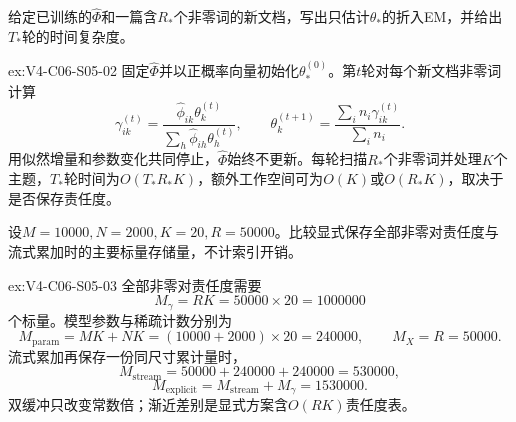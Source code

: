 \begin{SLChapterExercisePairSection}
\begin{exercise}\label{ex:V4-C06-S05-02}
给定已训练的$\widehat\Phi$和一篇含$R_*$个非零词的新文档，写出只估计$\theta_*$的折入EM，并给出$T_*$轮的时间复杂度。
\end{exercise}
\ifSLFullEdition
{}\label{sol:V4-C06-S05-02}
\begin{chapterexercisesolution}{ex:V4-C06-S05-02}
固定$\widehat\Phi$并以正概率向量初始化$\theta_*^{(0)}$。第$t$轮对每个新文档非零词计算
\[
\gamma_{ik}^{(t)}=
\frac{\widehat\phi_{ik}\theta_k^{(t)}}
{\sum_h\widehat\phi_{ih}\theta_h^{(t)}},
\qquad
\theta_k^{(t+1)}=
\frac{\sum_i n_i\gamma_{ik}^{(t)}}{\sum_i n_i}.
\]
用似然增量和参数变化共同停止，$\widehat\Phi$始终不更新。每轮扫描$R_*$个非零词并处理$K$个主题，$T_*$轮时间为$O(T_*R_*K)$，额外工作空间可为$O(K)$或$O(R_*K)$，取决于是否保存责任度。
\end{chapterexercisesolution}
\fi

\begin{exercise}\label{ex:V4-C06-S05-03}
设$M=10000,N=2000,K=20,R=50000$。比较显式保存全部非零对责任度与流式累加时的主要标量存储量，不计索引开销。
\end{exercise}
\ifSLFullEdition
{}\label{sol:V4-C06-S05-03}
\begin{chapterexercisesolution}{ex:V4-C06-S05-03}
全部非零对责任度需要
\[
M_{\gamma}=RK=50000\times20=1000000
\]
个标量。模型参数与稀疏计数分别为
\[
M_{\mathrm{param}}=MK+NK=(10000+2000)\times20=240000,
\qquad
M_X=R=50000.
\]
流式累加再保存一份同尺寸累计量时，
\[
M_{\mathrm{stream}}=50000+240000+240000=530000,
\]
\[
M_{\mathrm{explicit}}=M_{\mathrm{stream}}+M_\gamma=1530000.
\]
双缓冲只改变常数倍；渐近差别是显式方案含$O(RK)$责任度表。
\end{chapterexercisesolution}
\fi


\end{SLChapterExercisePairSection}

